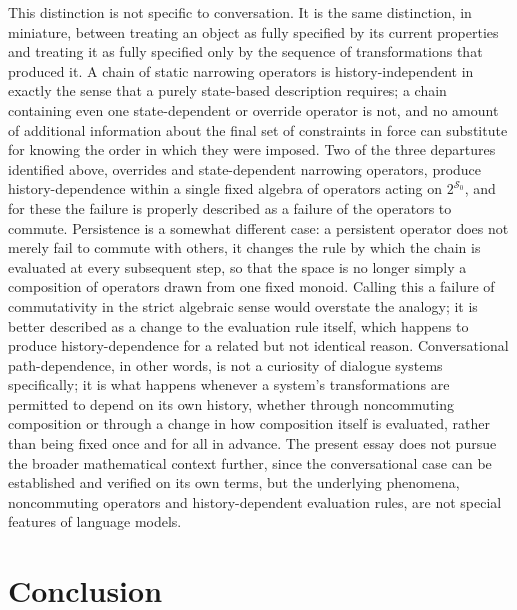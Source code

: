 \documentclass[11pt]{article}
\begin{document}
This distinction is not specific to conversation. It is the same distinction, in miniature, between treating an object as fully specified by its current properties and treating it as fully specified only by the sequence of transformations that produced it. A chain of static narrowing operators is history-independent in exactly the sense that a purely state-based description requires; a chain containing even one state-dependent or override operator is not, and no amount of additional information about the final set of constraints in force can substitute for knowing the order in which they were imposed. Two of the three departures identified above, overrides and state-dependent narrowing operators, produce history-dependence within a single fixed algebra of operators acting on $2^{\mathcal{S}_0}$, and for these the failure is properly described as a failure of the operators to commute. Persistence is a somewhat different case: a persistent operator does not merely fail to commute with others, it changes the rule by which the chain is evaluated at every subsequent step, so that the space is no longer simply a composition of operators drawn from one fixed monoid. Calling this a failure of commutativity in the strict algebraic sense would overstate the analogy; it is better described as a change to the evaluation rule itself, which happens to produce history-dependence for a related but not identical reason. Conversational path-dependence, in other words, is not a curiosity of dialogue systems specifically; it is what happens whenever a system's transformations are permitted to depend on its own history, whether through noncommuting composition or through a change in how composition itself is evaluated, rather than being fixed once and for all in advance. The present essay does not pursue the broader mathematical context further, since the conversational case can be established and verified on its own terms, but the underlying phenomena, noncommuting operators and history-dependent evaluation rules, are not special features of language models.

\section{Conclusion}
\end{document}
